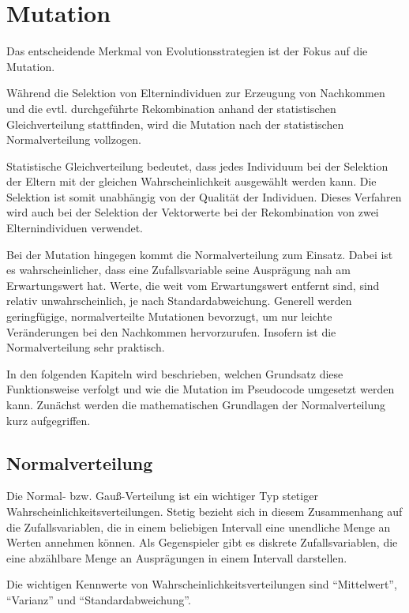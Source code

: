 

\section{Mutation}
\label{sec:mutation}

Das entscheidende Merkmal von Evolutionsstrategien ist der Fokus auf die Mutation.

Während die Selektion von Elternindividuen zur Erzeugung von Nachkommen und die evtl. durchgeführte Rekombination anhand der statistischen Gleichverteilung stattfinden, wird die Mutation nach der statistischen Normalverteilung vollzogen.

Statistische Gleichverteilung bedeutet, dass jedes Individuum bei der Selektion der Eltern mit der gleichen Wahrscheinlichkeit ausgewählt werden kann. Die Selektion ist somit unabhängig von der Qualität der Individuen. Dieses Verfahren wird auch bei der Selektion der Vektorwerte bei der Rekombination von zwei Elternindividuen verwendet.

Bei der Mutation hingegen kommt die Normalverteilung zum Einsatz. Dabei ist es wahrscheinlicher, dass eine Zufallsvariable seine Ausprägung nah am Erwartungswert hat. Werte, die weit vom Erwartungswert entfernt sind, sind relativ unwahrscheinlich, je nach Standardabweichung. Generell werden geringfügige, normalverteilte Mutationen bevorzugt, um nur leichte Veränderungen bei den Nachkommen hervorzurufen. Insofern ist die Normalverteilung sehr praktisch.

In den folgenden Kapiteln wird beschrieben, welchen Grundsatz diese Funktionsweise verfolgt und wie die Mutation im Pseudocode umgesetzt werden kann.
Zunächst werden die mathematischen Grundlagen der Normalverteilung kurz aufgegriffen.

\subsection{Normalverteilung}

Die Normal- bzw. Gauß-Verteilung ist ein wichtiger Typ stetiger Wahrscheinlichkeitsverteilungen.
Stetig bezieht sich in diesem Zusammenhang auf die Zufallsvariablen, die in einem beliebigen Intervall eine unendliche Menge an Werten annehmen können.
Als Gegenspieler gibt es diskrete Zufallsvariablen, die eine abzählbare Menge an Ausprägungen in einem Intervall darstellen.

Die wichtigen Kennwerte von Wahrscheinlichkeitsverteilungen sind \enquote{Mittelwert}, \enquote{Varianz} und \enquote{Standardabweichung}.


